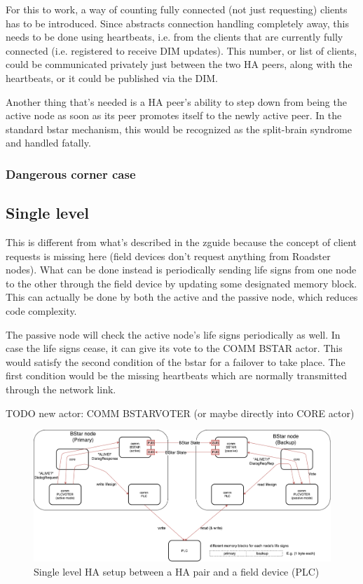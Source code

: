 For this to work, a way of counting fully connected (not just requesting)
clients has to be introduced. Since \zmq abstracts connection handling
completely away, this needs to be done using heartbeats, i.e. from the clients
that are currently fully connected (i.e. registered to receive DIM updates).
This number, or list of clients, could be communicated privately just between
the two HA peers, along with the heartbeats, or it could be published via the
DIM.

Another thing that's needed is a HA peer's ability to step down from being the
active node as soon as its peer promotes itself to the newly active peer. In
the standard \gls{bstar} mechanism, this would be recognized as the split-brain
syndrome and handled fatally.


\subsubsection{Dangerous corner case}

\subsection{Single level}
This is different from what's described in the \gls{zguide} because the concept of
client requests is missing here (field devices don't request anything from Roadster nodes).  What can be
done instead is periodically sending life signs from one node to the other
through the field device by updating some designated memory block. This can actually be
done by both the active and the passive node, which reduces code complexity.

The passive node will check the active node's life signs periodically as well.
In case the life signs cease, it can give its vote to the COMM BSTAR actor.
This would satisfy the second condition of the \gls{bstar} for a
failover to take place. The first condition would be the missing heartbeats
which are normally transmitted through the network link.

TODO new actor: COMM BSTARVOTER (or maybe directly into CORE actor)

\begin{figure}[]
	\includegraphics[width=\textwidth]{img/SL-HA_bstar.pdf}
	\caption{Single level HA setup between a HA pair and a field device (PLC)}
	\label{fig:sl-ha}
\end{figure}


